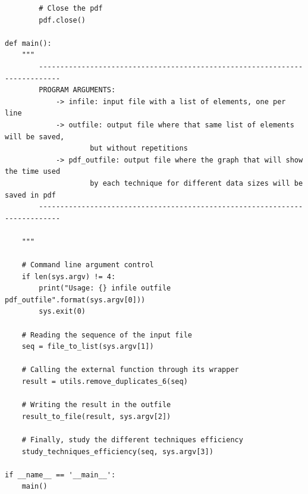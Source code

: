 \documentclass[12 pt]{article}
\begin{document}
\begin{lstlisting}
        # Close the pdf
        pdf.close()

def main():
    """
        ---------------------------------------------------------------------------
        PROGRAM ARGUMENTS:
            -> infile: input file with a list of elements, one per line
            -> outfile: output file where that same list of elements will be saved, 
                    but without repetitions
            -> pdf_outfile: output file where the graph that will show the time used
                    by each technique for different data sizes will be saved in pdf
        ---------------------------------------------------------------------------

    """

    # Command line argument control
    if len(sys.argv) != 4:
        print("Usage: {} infile outfile pdf_outfile".format(sys.argv[0]))
        sys.exit(0)

    # Reading the sequence of the input file
    seq = file_to_list(sys.argv[1])

    # Calling the external function through its wrapper
    result = utils.remove_duplicates_6(seq)

    # Writing the result in the outfile
    result_to_file(result, sys.argv[2])

    # Finally, study the different techniques efficiency
    study_techniques_efficiency(seq, sys.argv[3])

if __name__ == '__main__':
    main()

\end{lstlisting}
\newpage
\end{document}
